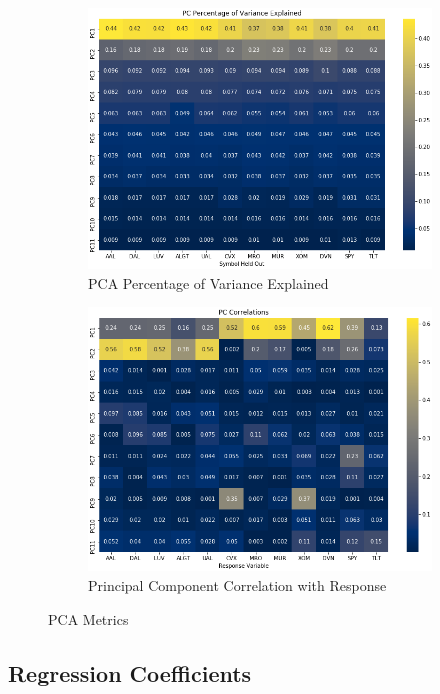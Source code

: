 \documentclass{article}
\begin{document}
\begin{figure}[h!]
  \centering
  \begin{subfigure}{.5\textwidth}
    \centering
    \includegraphics[width=.95\linewidth]{../Figures/PCA_pve.png}
    \caption{PCA Percentage of Variance Explained}
  \end{subfigure}%
  \begin{subfigure}{.5\textwidth}
    \centering
    \includegraphics[width=.95\linewidth]{../Figures/PCA_corr_resp.png}
    \caption{Principal Component Correlation with Response}
  \end{subfigure}
  \caption{PCA Metrics}
\end{figure}

\newpage
\subsection{Regression Coefficients}
\end{document}
